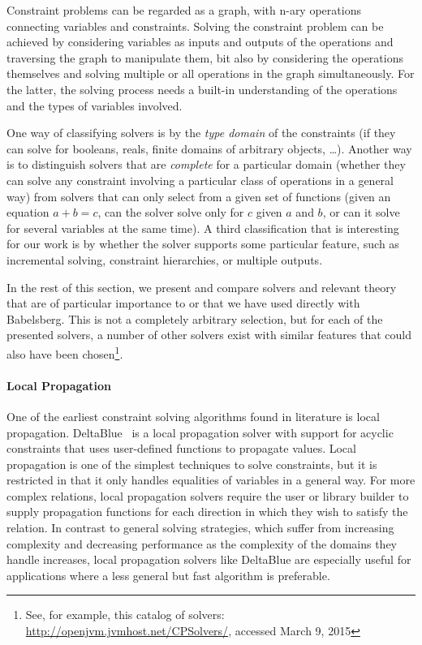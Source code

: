 Constraint problems can be regarded as a graph, with n-ary operations
connecting variables and constraints. Solving the constraint problem
can be achieved by considering variables as inputs and outputs of the
operations and traversing the graph to manipulate them, bit also by
considering the operations themselves and solving multiple or all
operations in the graph simultaneously. For the latter, the solving
process needs a built-in understanding of the operations and the types
of variables involved.

One way of classifying solvers is by the \emph{type domain} of the
constraints (\eg if they can solve for booleans, reals, finite domains
of arbitrary objects, \dots). Another way is to distinguish solvers
that are \emph{complete} for a particular domain (whether they can
solve any constraint involving a particular class of operations in a
general way) from solvers that can only select from a given set of
functions (\eg given an equation $a+b=c$, can the solver solve only
for $c$ given $a$ and $b$, or can it solve for several variables at
the same time). A third classification that is interesting for our
work is by whether the solver supports some particular feature, such
as incremental solving, constraint hierarchies, or multiple outputs.

In the rest of this section, we present and compare solvers and
relevant theory that are of particular importance to or that we have
used directly with Babelsberg. This is not a completely arbitrary
selection, but for each of the presented solvers, a number of other
solvers exist with similar features that could also have been
chosen\footnote{See, for example, this catalog of solvers:
  \url{http://openjvm.jvmhost.net/CPSolvers/}, accessed March 9,
  2015}.

\paragraph{Local Propagation}
\label{sec:deltablue}
One of the earliest constraint solving algorithms found in literature is local
propagation. DeltaBlue~\cite{freeman-benson-phoenix-1989} is a local propagation
solver with support for acyclic constraints that uses user-defined functions to
propagate values. Local propagation is one of the simplest techniques to solve
constraints, but it is restricted in that it only handles equalities of
variables in a general way. For more complex relations, local propagation
solvers require the user or library builder to supply propagation functions for
each direction in which they wish to satisfy the relation. In contrast to
general solving strategies, which suffer from increasing complexity and
decreasing performance as the complexity of the domains they handle increases,
local propagation solvers like DeltaBlue are especially useful for applications
where a less general but fast algorithm is preferable.

